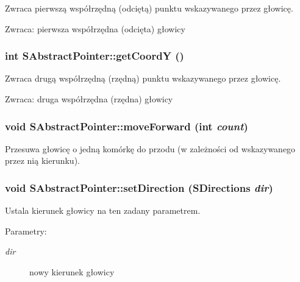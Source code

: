 Zwraca pierwszą współrzędną (odciętą) punktu wskazywanego przez głowicę. \begin{Desc}
\item[Zwraca:]pierwsza współrzędna (odcięta) głowicy \end{Desc}
\hypertarget{classSAbstractPointer_0226e83b6f838f3ee8491915b9ebab74}{
\subsubsection[{getCoordY}]{\setlength{\rightskip}{0pt plus 5cm}int SAbstractPointer::getCoordY ()}}
\label{classSAbstractPointer_0226e83b6f838f3ee8491915b9ebab74}


Zwraca drugą współrzędną (rzędną) punktu wskazywanego przez głowicę. \begin{Desc}
\item[Zwraca:]druga współrzędna (rzędna) głowicy \end{Desc}
\hypertarget{classSAbstractPointer_c4655988c5ae9f94a00e3ccd0ed14863}{
\subsubsection[{moveForward}]{\setlength{\rightskip}{0pt plus 5cm}void SAbstractPointer::moveForward (int {\em count})}}
\label{classSAbstractPointer_c4655988c5ae9f94a00e3ccd0ed14863}


Przesuwa głowicę o jedną komórkę do przodu (w zależności od wskazywanego przez nią kierunku). \hypertarget{classSAbstractPointer_e1b27cb6a14cbf77e4499d8ca1ae7c90}{
\subsubsection[{setDirection}]{\setlength{\rightskip}{0pt plus 5cm}void SAbstractPointer::setDirection ({\bf SDirections} {\em dir})}}
\label{classSAbstractPointer_e1b27cb6a14cbf77e4499d8ca1ae7c90}


Ustala kierunek głowicy na ten zadany parametrem. \begin{Desc}
\item[Parametry:]
\begin{description}
\item[{\em dir}]nowy kierunek głowicy \end{description}
\end{Desc}


